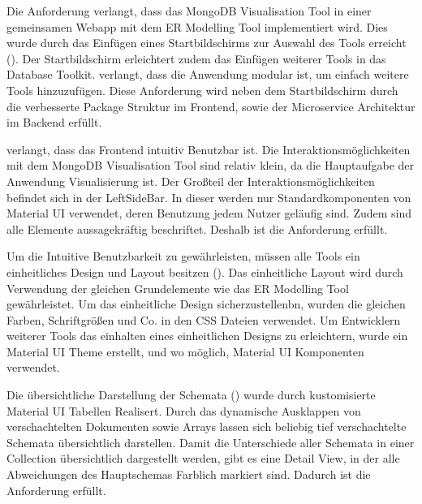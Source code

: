 \iffalse
Aufgabe des Kapitels Evaluierung ist es, in wie weit die Ziele der 
Arbeit erreicht wurden. Es sollen also die erreichten Arbeitsergebnisse 
mit den Zielen verglichen werden. Ergebnis der Evaluierung kann auch 
sein, das bestimmte Ziele nicht erreicht werden konnten, wobei die 
Ursachen hierfür auch außerhalb des Verantwortungsbereichs des 
Praktikanten liegen können.
\fi

Die Anforderung  verlangt, dass das MongoDB Visualisation Tool in einer gemeinsamen Webapp mit dem ER Modelling Tool implementiert wird.
Dies wurde durch das Einfügen eines Startbildschirms zur Auswahl des Tools erreicht ().
Der Startbildschirm erleichtert zudem das Einfügen weiterer Tools in das Database Toolkit.
 verlangt, dass die Anwendung modular ist, um einfach weitere Tools hinzuzufügen.
Diese Anforderung wird neben dem Startbildschirm durch die verbesserte Package Struktur im Frontend, sowie der Microservice Architektur im Backend erfüllt.

 verlangt, dass das Frontend intuitiv Benutzbar ist.
Die Interaktionsmöglichkeiten mit dem MongoDB Visualisation Tool sind relativ klein, da die Hauptaufgabe der Anwendung Visualisierung ist.
Der Großteil der Interaktionsmöglichkeiten befindet sich in der LeftSideBar.
In dieser werden nur Standardkomponenten von Material UI verwendet, deren Benutzung jedem Nutzer geläufig sind.
Zudem sind alle Elemente aussagekräftig beschriftet.
Deshalb ist die Anforderung  erfüllt.

Um die Intuitive Benutzbarkeit zu gewährleisten, müssen alle Tools ein einheitliches Design und Layout besitzen ().
Das einheitliche Layout wird durch Verwendung der gleichen Grundelemente wie das ER Modelling Tool gewährleistet.
Um das einheitliche Design sicherzustellenbn, wurden die gleichen Farben, Schriftgrößen und Co. in den CSS Dateien verwendet.
Um Entwicklern weiterer Tools das einhalten eines einheitlichen Designs zu erleichtern, wurde ein Material UI Theme erstellt, und wo möglich, Material UI Komponenten verwendet.

Die übersichtliche Darstellung der Schemata () wurde durch kustomisierte Material UI Tabellen Realisert.
Durch das dynamische Ausklappen von verschachtelten Dokumenten sowie Arrays lassen sich beliebig tief verschachtelte Schemata übersichtlich darstellen.
Damit die Unterschiede aller Schemata in einer Collection übersichtlich dargestellt werden, gibt es eine Detail View, in der alle Abweichungen des Hauptschemas Farblich markiert sind.
Dadurch ist die Anforderung  erfüllt.
